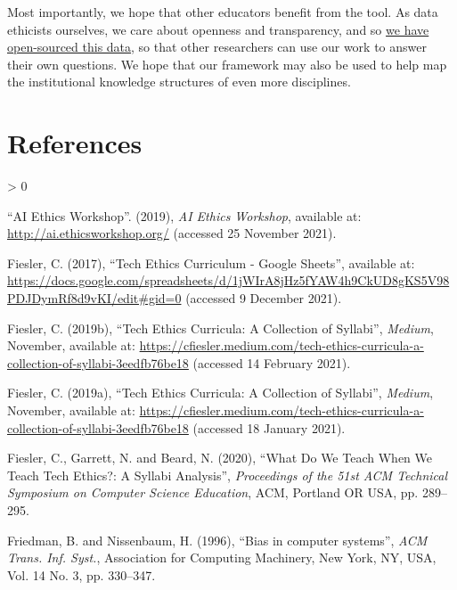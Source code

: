 \documentclass[
]{article}
\newlength{\cslhangindent}
\newenvironment{CSLReferences}[2] %
 {%
  \setlength{\parindent}{0pt}
  \ifodd #1 \everypar{\setlength{\hangindent}{\cslhangindent}}\ignorespaces\fi
  \ifnum #2 > 0
  \setlength{\parskip}{#2\baselineskip}
  \fi
 }%
 {}
\begin{document}
Most importantly, we hope that other educators benefit from the tool. As
data ethicists ourselves, we care about openness and transparency, and
so
\href{https://github.com/JonathanReeve/data-ethics-literature-review}{we
have open-sourced this data}, so that other researchers can use our work
to answer their own questions. We hope that our framework may also be
used to help map the institutional knowledge structures of even more
disciplines.

\hypertarget{references}{%
\section{References}\label{references}}

\hypertarget{refs}{}
\begin{CSLReferences}{1}{0}
\leavevmode\hypertarget{ref-ai_ethics}{}%
{``{AI} {Ethics} {Workshop}''}. (2019), \emph{AI Ethics Workshop},
available at: \url{http://ai.ethicsworkshop.org/} (accessed 25 November
2021).

\leavevmode\hypertarget{ref-fieslerTechEthicsCurriculum2017}{}%
Fiesler, C. (2017), {``Tech {Ethics} {Curriculum} - {Google}
{Sheets}''}, available at:
\url{https://docs.google.com/spreadsheets/d/1jWIrA8jHz5fYAW4h9CkUD8gKS5V98PDJDymRf8d9vKI/edit\#gid=0}
(accessed 9 December 2021).

\leavevmode\hypertarget{ref-fiesler_tech_2019}{}%
Fiesler, C. (2019b), {``Tech {Ethics} {Curricula}: {A} {Collection} of
{Syllabi}''}, \emph{Medium}, November, available at:
\url{https://cfiesler.medium.com/tech-ethics-curricula-a-collection-of-syllabi-3eedfb76be18}
(accessed 14 February 2021).

\leavevmode\hypertarget{ref-fieslerTechEthicsCurricula2019}{}%
Fiesler, C. (2019a), {``Tech {Ethics} {Curricula}: {A} {Collection} of
{Syllabi}''}, \emph{Medium}, November, available at:
\url{https://cfiesler.medium.com/tech-ethics-curricula-a-collection-of-syllabi-3eedfb76be18}
(accessed 18 January 2021).

\leavevmode\hypertarget{ref-fieslerWhatWeTeach2020}{}%
Fiesler, C., Garrett, N. and Beard, N. (2020), {``What {Do} {We} {Teach}
{When} {We} {Teach} {Tech} {Ethics}?: {A} {Syllabi} {Analysis}''},
\emph{Proceedings of the 51st {ACM} {Technical} {Symposium} on
{Computer} {Science} {Education}}, ACM, Portland OR USA, pp. 289--295.

\leavevmode\hypertarget{ref-nissenbaum1996}{}%
Friedman, B. and Nissenbaum, H. (1996), {``Bias in computer systems''},
\emph{ACM Trans. Inf. Syst.}, Association for Computing Machinery, New
York, NY, USA, Vol. 14 No. 3, pp. 330--347.


\end{CSLReferences}
\end{document}
